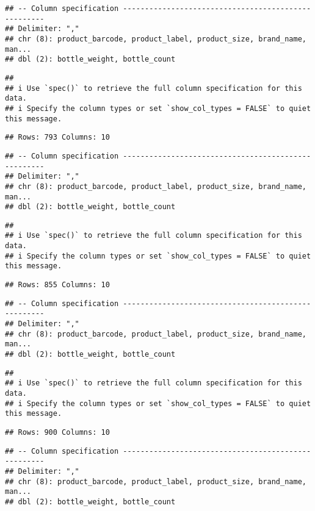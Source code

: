 \documentclass[
]{article}
\begin{document}
\begin{verbatim}
## -- Column specification ----------------------------------------------------
## Delimiter: ","
## chr (8): product_barcode, product_label, product_size, brand_name, man...
## dbl (2): bottle_weight, bottle_count
\end{verbatim}

\begin{verbatim}
## 
## i Use `spec()` to retrieve the full column specification for this data.
## i Specify the column types or set `show_col_types = FALSE` to quiet this message.
\end{verbatim}

\begin{verbatim}
## Rows: 793 Columns: 10
\end{verbatim}

\begin{verbatim}
## -- Column specification ----------------------------------------------------
## Delimiter: ","
## chr (8): product_barcode, product_label, product_size, brand_name, man...
## dbl (2): bottle_weight, bottle_count
\end{verbatim}

\begin{verbatim}
## 
## i Use `spec()` to retrieve the full column specification for this data.
## i Specify the column types or set `show_col_types = FALSE` to quiet this message.
\end{verbatim}

\begin{verbatim}
## Rows: 855 Columns: 10
\end{verbatim}

\begin{verbatim}
## -- Column specification ----------------------------------------------------
## Delimiter: ","
## chr (8): product_barcode, product_label, product_size, brand_name, man...
## dbl (2): bottle_weight, bottle_count
\end{verbatim}

\begin{verbatim}
## 
## i Use `spec()` to retrieve the full column specification for this data.
## i Specify the column types or set `show_col_types = FALSE` to quiet this message.
\end{verbatim}

\begin{verbatim}
## Rows: 900 Columns: 10
\end{verbatim}

\begin{verbatim}
## -- Column specification ----------------------------------------------------
## Delimiter: ","
## chr (8): product_barcode, product_label, product_size, brand_name, man...
## dbl (2): bottle_weight, bottle_count
\end{verbatim}
\end{document}
